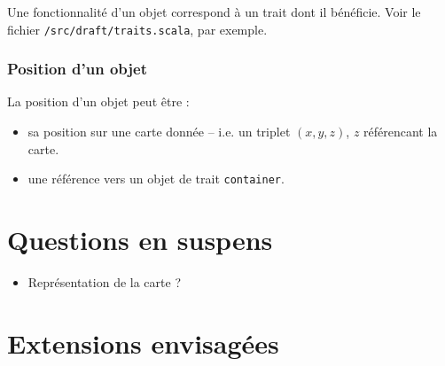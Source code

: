 \documentclass[french]{article}
\begin{document}
Une fonctionnalité d'un objet correspond à un trait dont il bénéficie.
Voir le fichier \texttt{/src/draft/traits.scala}, par exemple.


\subsubsection{Position d'un objet}

La position d'un objet peut être : 
\begin{itemize}
\item sa position sur une carte donnée – i.e. un triplet $(x,y,z)$, $z$
référencant la carte.
\item une référence vers un objet de trait \texttt{container}.
\end{itemize}

\section{Questions en suspens}
\begin{itemize}
\item Représentation de la carte ?
\end{itemize}

\section{Extensions envisagées}
\end{document}
